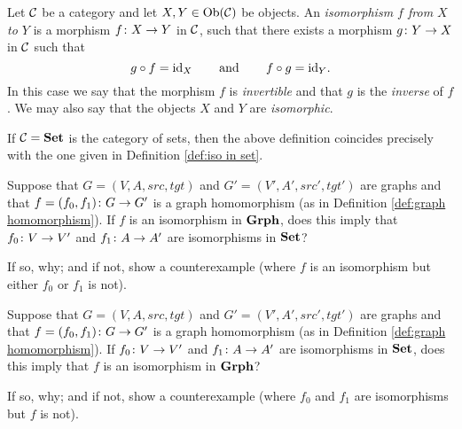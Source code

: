 \documentclass[CT4S-EN-RU]{subfiles}
\begin{document}
\begin{blockRUS}
\end{blockRUS}

\begin{definitionENG}
Let $\mathcal{C}$ be a category and let $X,Y\in\textnormal{Ob}(\mathcal{C})$ be objects. An {\em isomorphism $f$ from $X$ to $Y$} is a morphism $f\colon X\rightarrow Y$ in $\mathcal{C}$, such that there exists a morphism $g\colon Y\rightarrow X$ in $\mathcal{C}$ such that $$g\circ f=\textnormal{id}_X\hspace{.3in}\textnormal{and}\hspace{.3in} f\circ g=\textnormal{id}_Y.$$ In this case we say that the morphism $f$ is {\em invertible} and that $g$ is the {\em inverse} of $f$. We may also say that the objects $X$ and $Y$ are {\em isomorphic}.
\end{definitionENG}

\begin{definitionRUS}
\end{definitionRUS}

\begin{exampleENG}
If $\mathcal{C}={\bf Set}$ is the category of sets, then the above definition coincides precisely with the one given in Definition \ref{def:iso in set}.
\end{exampleENG}

\begin{exampleRUS}
\end{exampleRUS}

\begin{exerciseENG}
Suppose that $G=(V,A,src,tgt)$ and $G'=(V',A',src',tgt')$ are graphs and that $f=(f_0,f_1)\colon G\rightarrow G'$ is a graph homomorphism (as in Definition \ref{def:graph homomorphism}). 
\sexc If $f$ is an isomorphism in ${\bf Grph}$, does this imply that $f_0\colon V\rightarrow V'$ and $f_1\colon A\rightarrow A'$ are isomorphisms in ${\bf Set}$?
\item  If so, why; and if not, show a counterexample (where $f$ is an isomorphism but either $f_0$ or $f_1$ is not).
\endsexc
\end{exerciseENG}

\begin{exerciseRUS}
\end{exerciseRUS}

\begin{exerciseENG}
Suppose that $G=(V,A,src,tgt)$ and $G'=(V',A',src',tgt')$ are graphs and that $f=(f_0,f_1)\colon G\rightarrow G'$ is a graph homomorphism (as in Definition \ref{def:graph homomorphism}). 
\sexc If $f_0\colon V\rightarrow V'$ and $f_1\colon A\rightarrow A'$ are isomorphisms in ${\bf Set}$, does this imply that $f$ is an isomorphism in ${\bf Grph}$?
\item If so, why; and if not, show a counterexample (where $f_0$ and $f_1$ are isomorphisms but $f$ is not).
\endsexc
\end{exerciseENG}
\end{document}
